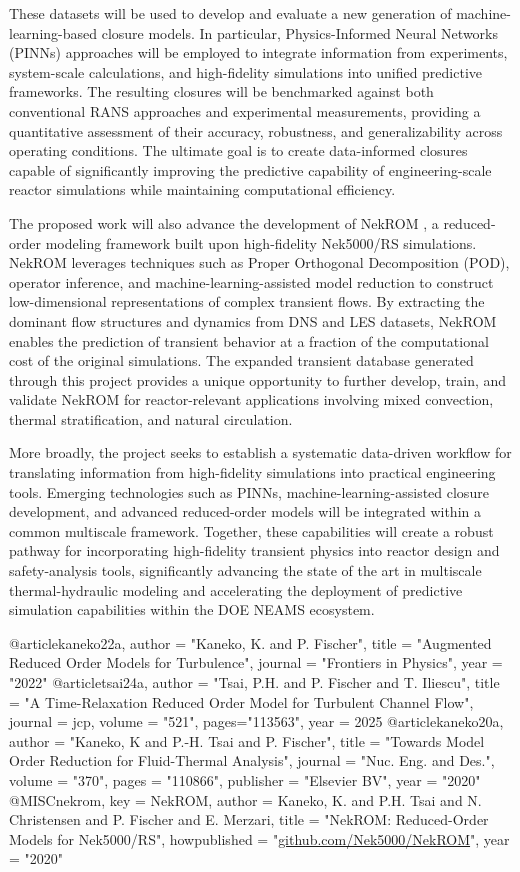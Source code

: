 
These datasets will be used to develop and evaluate a new generation of
machine-learning-based closure models. In particular, Physics-Informed Neural
Networks (PINNs) approaches will be employed to integrate information from
experiments, system-scale calculations, and high-fidelity simulations into
unified predictive frameworks. The resulting closures will be benchmarked
against both conventional RANS approaches and experimental measurements,
providing a quantitative assessment of their accuracy, robustness, and
generalizability across operating conditions. The ultimate goal is to create
data-informed closures capable of significantly improving the predictive
capability of engineering-scale reactor simulations while maintaining
computational efficiency.

The proposed work will also advance the development of NekROM
\cite{nekrom,kaneko20a,kaneko22a,tsai24a}, a reduced-order
modeling framework built upon high-fidelity Nek5000/RS simulations.
NekROM leverages techniques such as Proper Orthogonal Decomposition (POD),
operator inference, and machine-learning-assisted model reduction to construct
low-dimensional representations of complex transient flows. By extracting the
dominant flow structures and dynamics from DNS and LES datasets, NekROM enables
the prediction of transient behavior at a fraction of the computational cost of
the original simulations. The expanded transient database generated through
this project provides a unique opportunity to further develop, train, and
validate NekROM for reactor-relevant applications involving mixed convection,
thermal stratification, and natural circulation.

More broadly, the project seeks to establish a systematic data-driven workflow
for translating information from high-fidelity simulations into practical
engineering tools. Emerging technologies such as PINNs,
machine-learning-assisted closure development, and advanced reduced-order
models will be integrated within a common multiscale framework. Together, these
capabilities will create a robust pathway for incorporating high-fidelity
transient physics into reactor design and safety-analysis tools, significantly
advancing the state of the art in multiscale thermal-hydraulic modeling and
accelerating the deployment of predictive simulation capabilities within the
DOE NEAMS ecosystem.


@article{kaneko22a,
author = "Kaneko, K. and P. Fischer",
title = "Augmented Reduced Order Models for Turbulence",
journal = "Frontiers in Physics",
year = "2022"
}
@article{tsai24a,
author = "Tsai, P.H. and P. Fischer and T. Iliescu",
title = "A Time-Relaxation Reduced Order Model for Turbulent Channel Flow",
journal = jcp,
volume = "521",
pages="113563",
year = 2025}
@article{kaneko20a,
author = "Kaneko, K and P.-H. Tsai and P. Fischer",
title = "Towards Model Order Reduction for Fluid-Thermal Analysis",
journal = "Nuc. Eng. and Des.",
volume = "370",
pages = "110866",
publisher = "Elsevier BV",
year = "2020"
}
@MISC{nekrom,
key   = {NekROM},
author  = {Kaneko, K. and P.H. Tsai and N. Christensen and P. Fischer and E. Merzari},
title = "NekROM: Reduced-Order Models for {N}ek5000/{RS}",
howpublished = "{\url{github.com/Nek5000/NekROM}}",
year = "2020"
}

